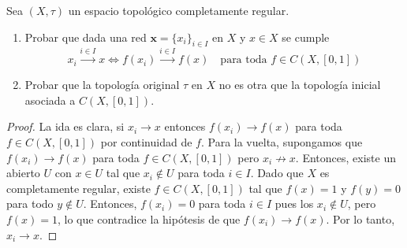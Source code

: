\documentclass{article}
\theoremstyle{plain}
\theoremstyle{definition}
\newenvironment{ejercicio}[1]{\begin{trivlist}
\item[\hskip \labelsep {\bfseries Ejercicio}\hskip \labelsep {\bfseries #1.}]}{\end{trivlist}}
\begin{document}
\begin{ejercicio}{2}
    Sea \( (X, \tau) \) un espacio topológico completamente regular.
    \begin{enumerate}
        \item Probar que dada una red \( \mathbf{x} = {\{x_i\}}_{i \in I} \) en \( X \) y \( x \in X \) se cumple
              \[
                  x_i \xrightarrow{i \in I} x \iff f(x_i) \xrightarrow{i \in I} f(x) \quad \text{para toda } f \in C(X, [0,1])
              \]
        \item Probar que la topología original \( \tau \) en \( X \) no es otra que la topología inicial asociada a \( C(X, [0,1]) \).
    \end{enumerate}
\end{ejercicio}
\begin{proof}
    La ida es clara, si \( x_i \to x \) entonces \( f(x_i) \to f(x) \) para toda \( f \in C(X, [0,1]) \) por continuidad de \( f \). Para la vuelta, supongamos que \( f(x_i) \to f(x) \) para toda \( f \in C(X, [0,1]) \) pero \( x_i \not\to x \). Entonces, existe un abierto \( U \) con \( x \in U \) tal que \( x_i \notin U \) para toda \( i \in I \). Dado que \( X \) es completamente regular, existe \( f \in C(X, [0, 1]) \) tal que \( f(x) = 1 \) y \( f(y) = 0 \) para todo \( y \notin U \). Entonces, \( f(x_i) = 0 \) para toda \( i \in I \) pues los \( x_i \notin U \), pero \( f(x) = 1 \), lo que contradice la hipótesis de que \( f(x_i) \to f(x) \). Por lo tanto, \( x_i \to x \).
\end{proof}
\end{document}
